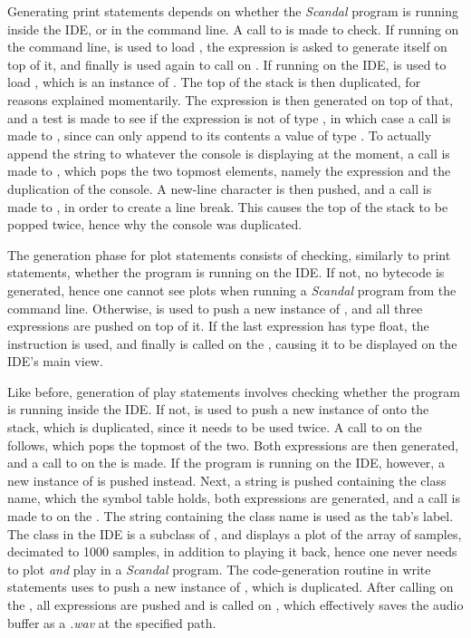 Generating print statements depends on whether the \emph{Scandal} program is running inside the IDE, or in the command line. A call to  is made to check. If running on the command line,  is used to load , the expression is asked to generate itself on top of it, and finally  is used again to call  on . If running on the IDE,  is used to load , which is an instance of . The top of the stack is then duplicated, for reasons explained momentarily. The expression is then generated on top of that, and a test is made to see if the expression is not of type , in which case a call is made to , since  can only append to its contents a value of type . To actually append the string to whatever the console is displaying at the moment, a call is made to , which pops the two topmost elements, namely the expression and the duplication of the console. A new-line character is then pushed, and a call is made to , in order to create a line break. This causes the top of the stack to be popped twice, hence why the console was duplicated.

The generation phase for plot statements consists of checking, similarly to print statements, whether the program is running on the IDE. If not, no bytecode is generated, hence one cannot see plots when running a \emph{Scandal} program from the command line. Otherwise,  is used to push a new instance of , and all three expressions are pushed on top of it. If the last expression has type float, the  instruction is used, and finally  is called on the , causing it to be displayed on the IDE's main view.

Like before, generation of play statements involves checking whether the program is running inside the IDE. If not,  is used to push a new instance of  onto the stack, which is duplicated, since it needs to be used twice. A call to  on the  follows, which pops the topmost of the two. Both expressions are then generated, and a call to  on the  is made. If the program is running on the IDE, however, a new instance of  is pushed instead. Next, a string is pushed containing the class name, which the symbol table holds, both expressions are generated, and a call is made to  on the . The string containing the class name is used as the tab's label. The  class in the IDE is a subclass of , and displays a plot of the array of samples, decimated to 1000 samples, in addition to playing it back, hence one never needs to plot \emph{and} play in a \emph{Scandal} program. The code-generation routine in write statements uses  to push a new instance of , which is duplicated. After calling  on the , all expressions are pushed and  is called on , which effectively saves the audio buffer as a \emph{.wav} at the specified path.

